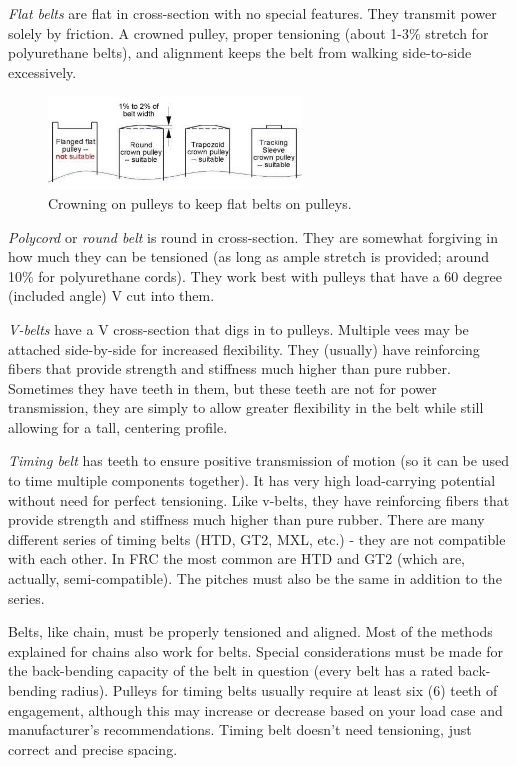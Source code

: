 \begin{asparaenum}[a)]
	\item \textit{Flat belts} are flat in cross-section with no special features. They transmit power solely by friction. A crowned pulley, proper tensioning (about 1-3\% stretch for polyurethane belts), and alignment keeps the belt from walking side-to-side excessively.
	\begin{figure}[H]
		\includegraphics[width=0.6\textwidth]{imgs/belt_crown_pulley.jpeg}
		\caption{Crowning on pulleys to keep flat belts on pulleys.}
	\end{figure}
	\item \textit{Polycord} or \textit{round belt} is round in cross-section. They are somewhat forgiving in how much they can be tensioned (as long as ample stretch is provided; around 10\% for polyurethane cords). They work best with pulleys that have a 60 degree (included angle) V cut into them.
	\item \textit{V-belts} have a V cross-section that digs in to pulleys. Multiple vees may be attached side-by-side for increased flexibility. They (usually) have reinforcing fibers that provide strength and stiffness much higher than pure rubber. Sometimes they have teeth in them, but these teeth are not for power transmission, they are simply to allow greater flexibility in the belt while still allowing for a tall, centering profile.
	\item \textit{Timing belt} has teeth to ensure positive transmission of motion (so it can be used to time multiple components together). It has very high load-carrying potential without need for perfect tensioning. Like v-belts, they have reinforcing fibers that provide strength and stiffness much higher than pure rubber. There are many different series of timing belts (HTD, GT2, MXL, etc.) - they are not compatible with each other. In FRC the most common are HTD and GT2 (which are, actually, semi-compatible). The pitches must also be the same in addition to the series.
\end{asparaenum}

Belts, like chain, must be properly tensioned and aligned. Most of the methods explained for chains also work for belts. Special considerations must be made for the back-bending capacity of the belt in question (every belt has a rated back-bending radius). Pulleys for timing belts usually require at least six (6) teeth of engagement, although this may increase or decrease based on your load case and manufacturer's recommendations.  Timing belt doesn't need tensioning, just correct and precise spacing.

